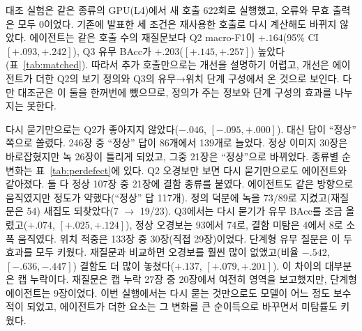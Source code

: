 \documentclass[11pt]{article}
\begin{document}
대조 실험은 같은 종류의 GPU(L4)에서 새 호출 622회로 실행했고, 오류와 무효 출력은 모두 0이었다. 기존에 발표한 세 조건은 재사용한 호출로 다시 계산해도 바뀌지 않았다. 에이전트는 같은 호출 수의 재질문보다 Q2 macro-F1이 $+.164$(95\% CI $[+.093,+.242]$), Q3 유무 BAcc가 $+.203$($[+.145,+.257]$) 높았다(표~\ref{tab:matched}). 따라서 추가 호출만으로는 개선을 설명하기 어렵고, 개선은 에이전트가 더한 Q2의 보기 정의와 Q3의 유무→위치 단계 구성에서 온 것으로 보인다. 다만 대조군은 이 둘을 한꺼번에 뺐으므로, 정의가 주는 정보와 단계 구성의 효과를 나누지는 못한다.

다시 묻기만으로는 Q2가 좋아지지 않았다($-.046$, $[-.095,+.000]$). 대신 답이 ``정상'' 쪽으로 쏠렸다. 246장 중 ``정상'' 답이 86개에서 139개로 늘었다. 정상 이미지 30장은 바로잡혔지만 녹 26장이 틀리게 되었고, 그중 21장은 ``정상''으로 바뀌었다. 종류별 순변화는 표~\ref{tab:perdefect}에 있다. Q2 오경보만 보면 다시 묻기만으로도 에이전트와 같아졌다. 둘 다 정상 107장 중 21장에 결함 종류를 붙였다. 에이전트도 같은 방향으로 움직였지만 정도가 약했다(``정상'' 답 117개). 정의 덕분에 녹을 73/89로 지켰고(재질문은 54) 새집도 되찾았다(7 $\rightarrow$ 19/23). Q3에서는 다시 묻기가 유무 BAcc를 조금 올렸고($+.074$, $[+.025,+.124]$), 정상 오경보는 93에서 74로, 결함 미탐은 4에서 8로 소폭 움직였다. 위치 적중은 133장 중 30장(직접 29장)이었다. 단계형 유무 질문은 이 두 효과를 모두 키웠다. 재질문과 비교하면 오경보를 훨씬 많이 없앴고(비율 $-.542$, $[-.636,-.447]$) 결함도 더 많이 놓쳤다($+.137$, $[+.079,+.201]$). 이 차이의 대부분은 캡 누락이다. 재질문은 캡 누락 27장 중 20장에서 여전히 영역을 보고했지만, 단계형 에이전트는 9장이었다. 이번 실행에서는 다시 묻는 것만으로도 모델이 어느 정도 보수적이 되었고, 에이전트가 더한 요소는 그 변화를 큰 순이득으로 바꾸면서 미탐률도 키웠다.
\end{document}
